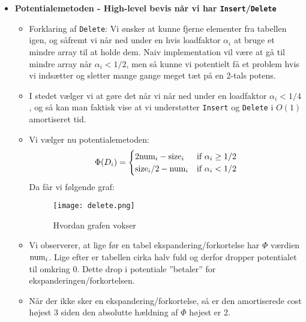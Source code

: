 \begin{itemize}
\item \textbf{Potentialemetoden - High-level bevis når vi har \texttt{Insert}/\texttt{Delete}}
\begin{itemize}
	\item Forklaring af \texttt{Delete}: Vi ønsker at kunne fjerne elementer fra tabellen igen, og såfremt vi når ned under en hvis loadfaktor $\alpha_i$ at bruge et mindre array til at holde dem. Naiv implementation vil være at gå til mindre array når $\alpha_i < 1/2$, men så kunne vi potentielt få et problem hvis vi indsætter og sletter mange gange meget tæt på en 2-tals potens.
	\item I stedet vælger vi at gøre det når vi når ned under en loadfaktor $\alpha_i < 1/4$, og så kan man faktisk vise at vi understøtter \texttt{Insert} og \texttt{Delete} i $O(1)$ amortiseret tid.
	\item Vi vælger nu potentialemetoden:
	\begin{align}
	\Phi(D_i) =
	\begin{cases}
	2 {\textrm{num} }_i - {\textrm{size} }_i   & {\textrm{if } } \alpha_i \geq 1/2\\
	{\textrm{size} }_i / 2 - {\textrm{num} }_i & {\textrm{if } } \alpha_i < 1/2
	\end{cases} \label{eq:pot2}
	\end{align}
	Da får vi følgende graf:
	\begin{figure}[H]
		\begin{center}
			\texttt{[image: delete.png]}
		\end{center}
		\caption{Hvordan grafen vokser}
		\label{fig:delete}
	\end{figure}

	\item Vi observerer, at lige før en tabel ekspandering/forkortelse har $\Phi$ værdien ${\textrm{num} }_i$. Lige efter er tabellen cirka halv fuld og derfor dropper potentialet til omkring $0$. Dette drop i potentiale ''betaler'' for ekspanderingen/forkortelsen.
	\item Når der ikke sker en ekspandering/forkortelse, så er den amortiserede cost højest 3 siden den absolutte hældning af $\Phi$ højest er 2.
	
\end{itemize}



\end{itemize}
